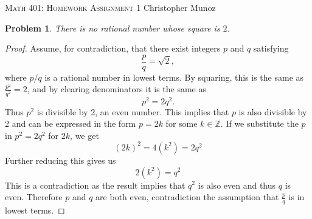 \documentclass[12pt]{article}
\newtheorem{problem}{Problem}
\newcommand{\ZZ}{\ensuremath{\mathbb Z}}
\begin{document}
\small
\noindent \textsc{Math 401: Homework Assignment 1} \hfill Christopher Munoz

\noindent \hfill \normalsize
\bigskip

\setcounter{problem}{0} %


\begin{problem} %
There is no rational number whose square is $2$. \end{problem}


\begin{proof}
Assume, for contradiction, that there exist integers $p$ and $q$ satisfying
	$$\frac{p}{q} = \sqrt{2},$$
where $p/q$ is a rational number in lowest terms.  By squaring, this is the same as $\frac{p^2}{q^2} = 2$, and by clearing denominators it is the same as
	$$p^2 = 2 q^2.$$
	Thus $p^2$ is divisible by 2, an even number. This implies that $p$ is also divisible by 2 and can be expressed in the form $p = 2k$ for some $k \in \ZZ$. If we substitute the $p$ in $p^2 = 2q^2$ for $2k$, we get
	$$(2k)^2 = 4(k^2) = 2q^2$$
	Further reducing this gives us
	$$2(k^2) = q^2$$
	This is a contradiction as the result implies that $q^2$ is also even and thus $q$ is even. Therefore $p$ and $q$ are both even, contradiction the assumption that $\frac{p}{q}$ is in lowest terms.

\end{proof}
\end{document}
